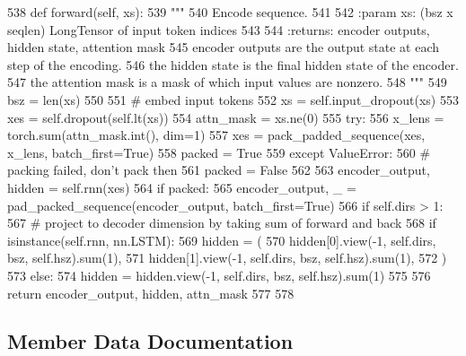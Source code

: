 \begin{DoxyCode}
538     \textcolor{keyword}{def }forward(self, xs):
539         \textcolor{stringliteral}{"""}
540 \textcolor{stringliteral}{        Encode sequence.}
541 \textcolor{stringliteral}{}
542 \textcolor{stringliteral}{        :param xs: (bsz x seqlen) LongTensor of input token indices}
543 \textcolor{stringliteral}{}
544 \textcolor{stringliteral}{        :returns: encoder outputs, hidden state, attention mask}
545 \textcolor{stringliteral}{            encoder outputs are the output state at each step of the encoding.}
546 \textcolor{stringliteral}{            the hidden state is the final hidden state of the encoder.}
547 \textcolor{stringliteral}{            the attention mask is a mask of which input values are nonzero.}
548 \textcolor{stringliteral}{        """}
549         bsz = len(xs)
550 
551         \textcolor{comment}{# embed input tokens}
552         xs = self.input\_dropout(xs)
553         xes = self.dropout(self.lt(xs))
554         attn\_mask = xs.ne(0)
555         \textcolor{keywordflow}{try}:
556             x\_lens = torch.sum(attn\_mask.int(), dim=1)
557             xes = pack\_padded\_sequence(xes, x\_lens, batch\_first=\textcolor{keyword}{True})
558             packed = \textcolor{keyword}{True}
559         \textcolor{keywordflow}{except} ValueError:
560             \textcolor{comment}{# packing failed, don't pack then}
561             packed = \textcolor{keyword}{False}
562 
563         encoder\_output, hidden = self.rnn(xes)
564         \textcolor{keywordflow}{if} packed:
565             encoder\_output, \_ = pad\_packed\_sequence(encoder\_output, batch\_first=\textcolor{keyword}{True})
566         \textcolor{keywordflow}{if} self.dirs > 1:
567             \textcolor{comment}{# project to decoder dimension by taking sum of forward and back}
568             \textcolor{keywordflow}{if} isinstance(self.rnn, nn.LSTM):
569                 hidden = (
570                     hidden[0].view(-1, self.dirs, bsz, self.hsz).sum(1),
571                     hidden[1].view(-1, self.dirs, bsz, self.hsz).sum(1),
572                 )
573             \textcolor{keywordflow}{else}:
574                 hidden = hidden.view(-1, self.dirs, bsz, self.hsz).sum(1)
575 
576         \textcolor{keywordflow}{return} encoder\_output, hidden, attn\_mask
577 
578 
\end{DoxyCode}


\subsection{Member Data Documentation}
\mbox{\label{classprojects_1_1controllable__dialogue_1_1controllable__seq2seq_1_1modules_1_1RNNEncoder_a46ccf005ad266cc15e44dd91e750efe7}} 
